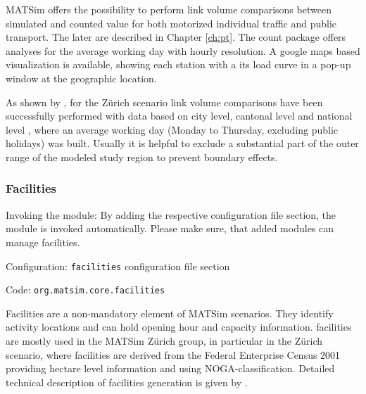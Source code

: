 MATSim offers the possibility to perform link volume comparisons between simulated and counted value for both motorized individual traffic \citep{Horni_unpub_IVT_2007}  and public transport. The later are described in Chapter \ref{ch:pt}. The count package offers analyses for the average working day with hourly resolution. A google maps based visualization is available, showing each station with a its load curve in a pop-up window at the geographic location.

As shown by \citet[][]{BalmerEtAl_ResRep_bdktzrh_2009}, for the Zürich scenario link volume comparisons have been successfully performed with data based on city level, cantonal level and national level \citep[][]{ASTRA_Webpage_2006}, where an average working day (Monday to Thursday, excluding public holidays) was built. Usually it is helpful to exclude a substantial part of the outer range of the modeled study region to prevent boundary effects.

\subsubsection{Facilities}
\label{sec:facilities}
\begin{compactitem}
\item Invoking the module: By adding the respective configuration file section, the module is invoked automatically. Please make sure, that added modules can manage facilities.
\item Configuration: \lstinline|facilities| configuration file section
\item Code: \lstinline|org.matsim.core.facilities|
\end{compactitem}

Facilities are a non-mandatory element of MATSim scenarios. They identify activity locations and can hold opening hour and capacity information. facilities are mostly used in the MATSim Zürich group, in particular in the Zürich scenario, where facilities are derived from the Federal Enterprise Census 2001 \citep[][]{SwissEnterpriseCensus_manual_2001} providing hectare level information and using NOGA-classification. Detailed technical description of facilities generation is given by \citet[][]{Meister_TechRep_IVT_2008, Meister_unpub_IVT_2007}.



